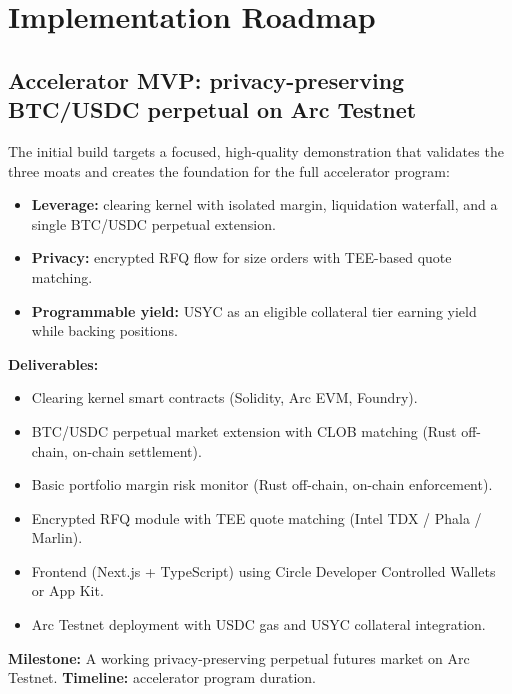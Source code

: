 \documentclass[11pt,a4paper]{article}
\begin{document}
\section{Implementation Roadmap}
\label{sec:roadmap}

\subsection{Accelerator MVP: privacy-preserving BTC/USDC perpetual on Arc Testnet}

The initial build targets a focused, high-quality demonstration that validates the three moats and creates the foundation for the full accelerator program:

\begin{itemize}
  \item \textbf{Leverage:} clearing kernel with isolated margin, liquidation waterfall, and a single BTC/USDC perpetual extension.
  \item \textbf{Privacy:} encrypted RFQ flow for size orders with TEE-based quote matching.
  \item \textbf{Programmable yield:} USYC as an eligible collateral tier earning yield while backing positions.
\end{itemize}

\textbf{Deliverables:}
\begin{itemize}
  \item Clearing kernel smart contracts (Solidity, Arc EVM, Foundry).
  \item BTC/USDC perpetual market extension with CLOB matching (Rust off-chain, on-chain settlement).
  \item Basic portfolio margin risk monitor (Rust off-chain, on-chain enforcement).
  \item Encrypted RFQ module with TEE quote matching (Intel TDX / Phala / Marlin).
  \item Frontend (Next.js + TypeScript) using Circle Developer Controlled Wallets or App Kit.
  \item Arc Testnet deployment with USDC gas and USYC collateral integration.
\end{itemize}

\textbf{Milestone:} A working privacy-preserving perpetual futures market on Arc Testnet. \textbf{Timeline:} accelerator program duration.
\end{document}
